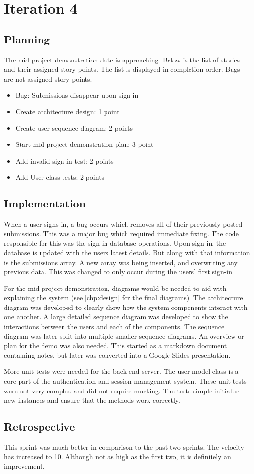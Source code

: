 \chapter{Iteration 4}
\section{Planning}
The mid-project demonstration date is approaching. Below is the list of stories and their assigned story points. The list is displayed in completion order. Bugs are not assigned story points.

\begin{itemize}
\item Bug: Submissions disappear upon sign-in
\item Create architecture design: 1 point
\item Create user sequence diagram: 2 points
\item Start mid-project demonstration plan: 3 point
\item Add invalid sign-in test: 2 points
\item Add User class tests: 2 points
\end{itemize}

\section{Implementation}
When a user signs in, a bug occurs which removes all of their previously posted submissions. This was a major bug which required immediate fixing. The code responsible for this was the sign-in database operations. Upon sign-in, the database is updated with the users latest details. But along with that information is the submissions array. A new array was being inserted, and overwriting any previous data. This was changed to only occur during the users' first sign-in.

For the mid-project demonstration, diagrams would be needed to aid with explaining the system (see \autoref{chp:design} for the final diagrams). The architecture diagram was developed to clearly show how the system components interact with one another. A large detailed sequence diagram was developed to show the interactions between the users and each of the components. The sequence diagram was later split into multiple smaller sequence diagrams. An overview or plan for the demo was also needed. This started as a markdown document containing notes, but later was converted into a Google Slides presentation.

More unit tests were needed for the back-end server. The user model class is a core part of the authentication and session management system. These unit tests were not very complex and did not require mocking. The tests simple initialise new instances and ensure that the methods work correctly.

\section{Retrospective}
This sprint was much better in comparison to the past two sprints. The velocity has increased to 10. Although not as high as the first two, it is definitely an improvement.
